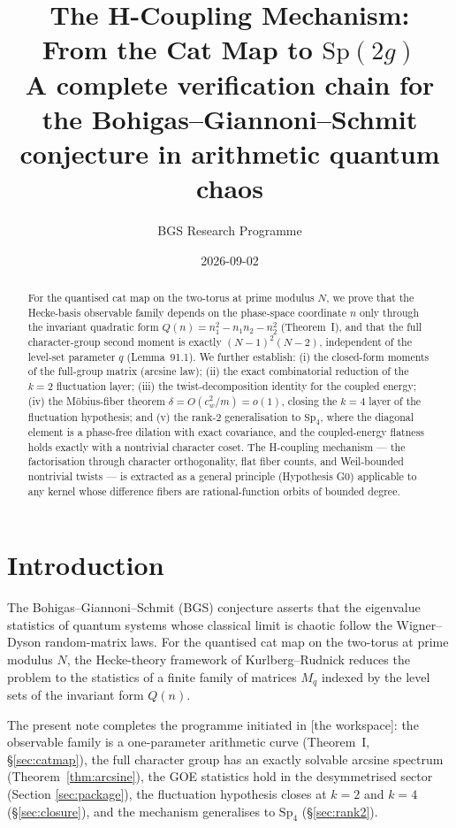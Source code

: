 \documentclass[11pt]{article}
\title{The H-Coupling Mechanism:\\
  From the Cat Map to $\mathrm{Sp}(2g)$\\[1em]
  \large A complete verification chain for the Bohigas--Giannoni--Schmit\\
  conjecture in arithmetic quantum chaos}
\author{BGS Research Programme}
\date{2026-09-02}
\begin{document}
\maketitle

\begin{abstract}
For the quantised cat map on the two-torus at prime modulus $N$, we prove
that the Hecke-basis observable family depends on the phase-space
coordinate $n$ only through the invariant quadratic form
$Q(n) = n_1^2 - n_1 n_2 - n_2^2$ (Theorem~I), and that the full
character-group second moment is exactly $(N{-}1)^2(N{-}2)$, independent
of the level-set parameter $q$ (Lemma~91.1).  We further establish: (i)
the closed-form moments of the full-group matrix (arcsine law); (ii) the
exact combinatorial reduction of the $k{=}2$ fluctuation layer; (iii) the
twist-decomposition identity for the coupled energy; (iv) the
M\"obius-fiber theorem $\delta = O(c_w^2/m) = o(1)$, closing the
$k{=}4$ layer of the fluctuation hypothesis; and (v) the rank-2
generalisation to $\mathrm{Sp}_4$, where the diagonal element is a
phase-free dilation with exact covariance, and the coupled-energy
flatness holds exactly with a nontrivial character coset.  The
H-coupling mechanism — the factorisation through character orthogonality,
flat fiber counts, and Weil-bounded nontrivial twists — is extracted as
a general principle (Hypothesis G0) applicable to any kernel whose
difference fibers are rational-function orbits of bounded degree.
\end{abstract}

\section{Introduction}\label{sec:intro}

The Bohigas--Giannoni--Schmit (BGS) conjecture asserts that the
eigenvalue statistics of quantum systems whose classical limit is
chaotic follow the Wigner--Dyson random-matrix laws.  For the
quantised cat map on the two-torus at prime modulus $N$, the
Hecke-theory framework of Kurlberg--Rudnick reduces the problem to
the statistics of a finite family of matrices $M_q$ indexed by the
level sets of the invariant form $Q(n)$.

The present note completes the programme initiated in [the
workspace]: the observable family is a one-parameter arithmetic curve
(Theorem~I, \S\ref{sec:catmap}), the full character group has an
exactly solvable arcsine spectrum (Theorem~\ref{thm:arcsine}), the
GOE statistics hold in the desymmetrised sector (Section \ref{sec:package}), the fluctuation hypothesis closes at
$k = 2$ and $k = 4$ (\S\ref{sec:closure}), and the mechanism
generalises to $\mathrm{Sp}_4$ (\S\ref{sec:rank2}).
\end{document}
